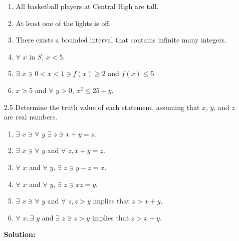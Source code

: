 \begin{enumerate}
      \begin{enumerate}
         \item All basketball players at Central High are tall.
         \item At least one of the lights is off.
         \item There exists a bounded interval that contains infinite many
               integers.
         \item $\forall$ $x$ in $S$, $x < 5$.
         \item $\exists$ $x \ni 0 < x < 1 \ni f(x) \ge 2$ and $f(x) \le 5$.
         \item $x > 5$ and $\forall$ $y > 0$, $x^2 \le 25 + y$.
      \end{enumerate}
   \item[2.5] Determine the truth value of each statement, assuming that $x$,
              $y$, and $z$ are real numbers.
      \begin{enumerate}
         \item $\exists$ $x \ni \forall$ $y$ $\exists$ $z \ni x + y = z$.
         \item $\exists$ $x \ni \forall$ $y$ and $\forall$ $z, x + y = z$.
         \item $\forall$ $x$ and $\forall$ $y$, $\exists$ $z \ni y - z = x$.
         \item $\forall$ $x$ and $\forall$ $y$, $\exists$ $z \ni xz = y$.
         \item $\exists$ $x \ni \forall$ $y$ and $\forall$ $z, z > y$ implies 
               that $z > x + y$.
         \item $\forall$ $x, \exists$ $y$ and $\exists$ $z \ni z > y$ implies 
               that $z > x + y$.
      \end{enumerate}

      \textbf{Solution:} 


\end{enumerate}
